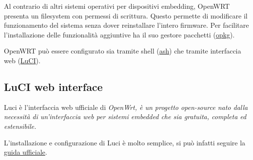 Al contrario di altri sistemi operativi per dispositivi embedding, OpenWRT presenta un filesystem con permessi di scrittura. Questo permette di modificare il funzionamento del sistema senza dover reinstallare l'intero firmware. Per facilitare l'installazione delle funzionalità aggiuntive ha il suo gestore pacchetti (\href{https://openwrt.org/docs/guide-user/additional-software/opkg}{opkg}).


OpenWRT può essere configurato sia tramite shell (\href{https://en.wikipedia.org/wiki/Almquist_shell}{ash}) che tramite interfaccia web (\href{https://openwrt.org/docs/guide-user/luci/start}{LuCI}).


\subsection{LuCI web interface}

Luci è l'interfaccia web ufficiale di \it{OpenWrt}, è un progetto open-source nato dalla necessità di un'interfaccia web per sistemi embedded che sia gratuita, completa ed estensibile.

L'installazione e configurazione di Luci è molto semplice, si può infatti seguire la \href{https://openwrt.org/docs/guide-user/luci/luci.essentials}{guida ufficiale}.


